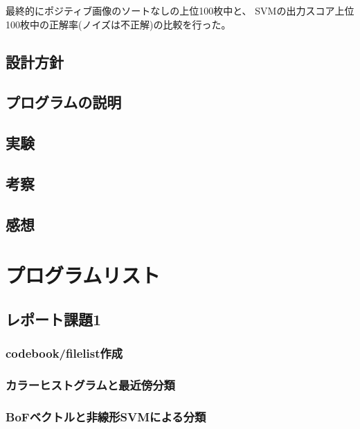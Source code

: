 \documentclass[11pt,a4paper, uplatex]{jsreport}
\begin{document}
最終的にポジティブ画像のソートなしの上位100枚中と、
SVMの出力スコア上位100枚中の正解率(ノイズは不正解)の比較を行った。
\section{設計方針}
\section{プログラムの説明}
\section{実験}
\section{考察}
\section{感想}

\appendix
\chapter{プログラムリスト}
\section{レポート課題1}
\subsection{codebook/filelist作成}




\subsection{カラーヒストグラムと最近傍分類}



\subsection{BoFベクトルと非線形SVMによる分類}




\end{document}
